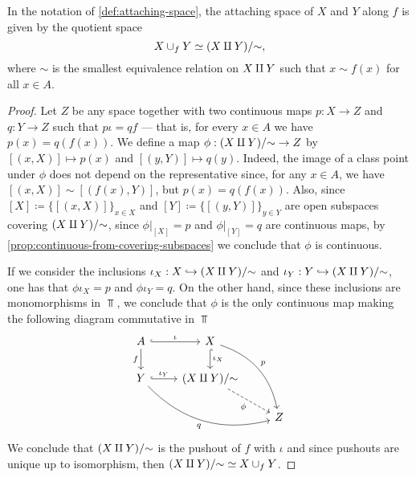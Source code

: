 \begin{corollary}
    \label{cor:attaching-space-as-quotient}
    In the notation of \cref{def:attaching-space}, the attaching space of \(X\) and
    \(Y\) along \(f\) is given by the quotient space
    \[
        X \cup_f Y \simeq (X \amalg Y)/{\sim},
    \]
    where \(\sim\) is the smallest equivalence relation on \(X \amalg Y\) such that
    \(x \sim f(x)\) for all \(x \in A\).
\end{corollary}

\begin{proof}
    Let \(Z\) be any space together with two continuous maps \(p: X \to Z\) and
    \(q: Y \to Z\) such that \(p \iota = q f\) --- that is, for every \(x \in A\) we
    have \(p(x) = q(f(x))\). We define a map \(\phi: (X \amalg Y)/{\sim} \to Z\) by
    \([(x, X)] \mapsto p(x)\) and \([(y, Y)] \mapsto q(y)\). Indeed, the image of a
    class point under \(\phi\) does not depend on the representative since, for any
    \(x \in A\), we have \([(x, X)] \sim [(f(x), Y)]\), but \(p(x) =
    q(f(x))\). Also, since \([X] \coloneq \{[(x, X)]\}_{x \in X}\) and
    \([Y] \coloneq \{[(y, Y)]\}_{y \in Y}\) are open subspaces covering
    \((X \amalg Y)/{\sim}\), since \(\phi|_{[X]} = p\) and \(\phi|_{[Y]} = q\) are
    continuous maps, by \cref{prop:continuous-from-covering-subspaces} we conclude
    that \(\phi\) is continuous.

    If we consider the inclusions \(\iota_X: X \hookrightarrow (X \amalg Y)/{\sim}\) and
    \(\iota_Y: Y \hookrightarrow (X \amalg Y)/{\sim}\), one has that \(\phi \iota_X = p\) and
    \(\phi \iota_Y = q\). On the other hand, since these inclusions are
    monomorphisms in \(\Top\), we conclude that \(\phi\) is the only continuous map
    making the following diagram commutative in \(\Top\)
    \[
        \begin{tikzcd}
            A \ar[r, hook, "\iota"] \ar[d, "f"']
            &X \ar[drd, bend left, "p"] \ar[d, hook, "\iota_X"]  &\\
            Y \ar[r, "\iota_Y", hook] \ar[rrd, "q"', bend right]
            &(X \disj Y)/{\sim} \ar[rd, "\phi"', dashed]  &\\
            & &Z
        \end{tikzcd}
    \]
    We conclude that \((X \amalg Y)/{\sim}\) is the pushout of \(f\) with \(\iota\)
    and since pushouts are unique up to isomorphism, then
    \((X \amalg Y)/{\sim} \simeq X \cup_f Y\).
\end{proof}

